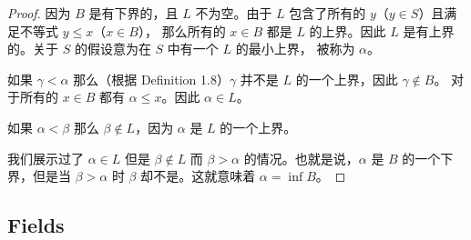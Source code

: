 \documentclass[../poma-notes.tex]{subfiles}
\begin{document}
\begin{proof}
	因为 $B$ 是有下界的，且 $L$ 不为空。由于 $L$ 包含了所有的 $y$（$y \in S$）且满足不等式 $y \leq x$（$x \in B$），
	那么所有的 $x \in B$ 都是 $L$ 的上界。因此 $L$ 是有上界的。关于 $S$ 的假设意为在 $S$ 中有一个 $L$ 的最小上界，
	被称为 $\alpha$。

	如果 $\gamma < \alpha$ 那么（根据 Definition 1.8）$\gamma$ 并不是 $L$ 的一个上界，因此 $\gamma \notin B$。
	对于所有的 $x \in B$ 都有 $\alpha \le x$。因此 $\alpha \in L$。

	如果 $\alpha < \beta$ 那么 $\beta \notin L$，因为 $\alpha$ 是 $L$ 的一个上界。

	我们展示过了 $\alpha \in L$ 但是 $\beta \notin L$ 而 $\beta > \alpha$ 的情况。也就是说，$\alpha$
	是 $B$ 的一个下界，但是当 $\beta > \alpha$ 时 $\beta$ 却不是。这就意味着 $\alpha = \inf B$。
\end{proof}

\subsection*{Fields}
\end{document}
